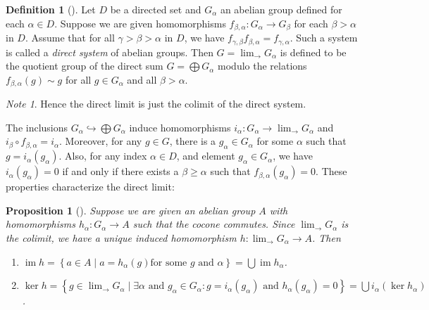 \documentclass[reqno]{amsart}
\newtheorem{proposition}[theorem]{Proposition}
\theoremstyle{definition}
\newtheorem{definition}[theorem]{Definition}
\theoremstyle{remark}
\newtheorem*{note}{Note}
\DeclareMathOperator{\im}{im}
\begin{document}
\begin{definition}[]
    Let $D$ be a directed set and $G_{\alpha}$ an abelian group
    defined for each $\alpha \in D$. Suppose
    we are given homomorphisms
    $f_{\beta, \alpha} \colon G_{\alpha} \to G_{\beta}$ 
    for each $\beta > \alpha$ in $D$. Assume that for all
    $\gamma > \beta > \alpha$ in $D$, we have
    $f_{\gamma, \beta} f_{\beta, \alpha} = f_{\gamma, \alpha}$.
    Such a system is called a \textit{direct system} of abelian
    groups. Then $G = \lim_{\rightarrow} G_{\alpha}$ is defined
    to be the quotient group of the direct sum
    $G = \bigoplus G_{\alpha}$ modulo the relations
    $f_{\beta, \alpha}(g) \sim g$ for all $g \in G_\alpha$ and
    all $\beta > \alpha$.

    \begin{note}
        Hence the direct limit is just the colimit of the direct
        system.
    \end{note}
\end{definition}

The inclusions
$G_{\alpha} \hookrightarrow \bigoplus G_{\alpha}$ induce
homomorphisms
$i_{\alpha} \colon G_{\alpha} \to \lim_{\rightarrow}G_{\alpha}$ and
$i_{\beta} \circ f_{\beta, \alpha} = i_{\alpha}$. Moreover,
for any $g \in G$, there is a $g_{\alpha}\in G_{\alpha}$ for
some $\alpha$ such that $g = i_{\alpha} (g_{\alpha})$.
Also, for any index $\alpha \in D$, and element
$g_{\alpha} \in G_{\alpha}$, we have
$i_{\alpha}(g_{\alpha}) = 0$ if and only if
there exists a  $\beta \ge \alpha$ such that
$f_{\beta, \alpha}(g_{\alpha}) = 0$. These properties
characterize the direct limit:

\begin{proposition}[]\label{Prop:OXKXKCL}
    Suppose we are given an abelian group
    $A$ with homomorphisms
    $h_{\alpha} \colon G_{\alpha} \to A$ 
    such that the cocone commutes.
    Since $\lim_{\rightarrow} G_{\alpha}$ is the colimit, we
    have a unique induced homomorphism
    $h \colon \lim_{\rightarrow} G_{\alpha} \to A$.
    Then
    \begin{enumerate}
        \item $\im h = 
            \left\{ a \in A \mid a = h_{\alpha}(g) \text{
            for some } g \text{ and } \alpha \right\} 
            = \bigcup \im h_{\alpha} $.
        \item $\ker h = 
            \left\{ g \in \lim_{\rightarrow} G_{\alpha}  \mid 
            \exists \alpha \text{ and } 
        g_{\alpha} \in G_{\alpha} \colon g = 
    i_{\alpha}(g_{\alpha}) \text{ and }
h_{\alpha}(g_{\alpha}) = 0\right\} = 
\bigcup i_{\alpha}(\ker h_{\alpha}) $.
    \end{enumerate}
\end{proposition}
\end{document}
